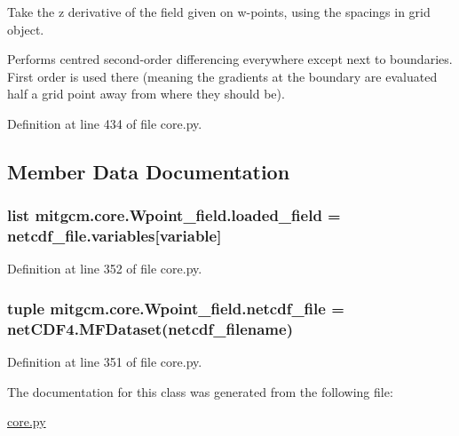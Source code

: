 Take the z derivative of the field given on w-\/points, using the spacings in grid object. 

Performs centred second-\/order differencing everywhere except next to boundaries. First order is used there (meaning the gradients at the boundary are evaluated half a grid point away from where they should be). 

Definition at line 434 of file core.\+py.



\subsection{Member Data Documentation}
\hypertarget{classmitgcm_1_1core_1_1Wpoint__field_acfbb89a604280097ac640e55edc60d21}{}
\subsubsection[{loaded\+\_\+field}]{\setlength{\rightskip}{0pt plus 5cm}list mitgcm.\+core.\+Wpoint\+\_\+field.\+loaded\+\_\+field = netcdf\+\_\+file.\+variables\mbox{[}variable\mbox{]}\hspace{0.3cm}{\ttfamily [static]}}\label{classmitgcm_1_1core_1_1Wpoint__field_acfbb89a604280097ac640e55edc60d21}


Definition at line 352 of file core.\+py.

\hypertarget{classmitgcm_1_1core_1_1Wpoint__field_af9c1d07b6f48ca4ea7fc11f766b406b6}{}
\subsubsection[{netcdf\+\_\+file}]{\setlength{\rightskip}{0pt plus 5cm}tuple mitgcm.\+core.\+Wpoint\+\_\+field.\+netcdf\+\_\+file = net\+C\+D\+F4.\+M\+F\+Dataset(netcdf\+\_\+filename)\hspace{0.3cm}{\ttfamily [static]}}\label{classmitgcm_1_1core_1_1Wpoint__field_af9c1d07b6f48ca4ea7fc11f766b406b6}


Definition at line 351 of file core.\+py.



The documentation for this class was generated from the following file\+:\begin{DoxyCompactItemize}
\item 
\hyperlink{core_8py}{core.\+py}\end{DoxyCompactItemize}

